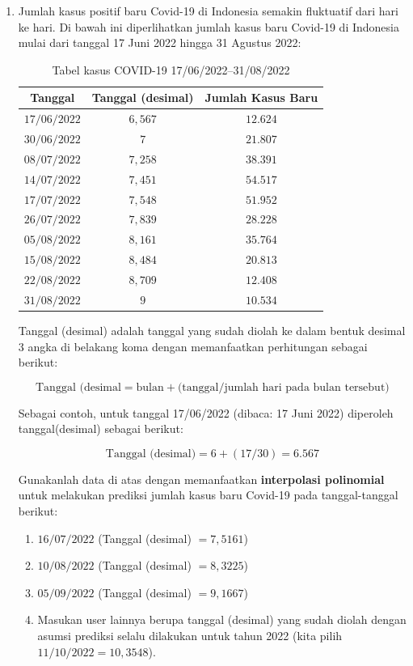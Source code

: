 \begin{enumerate}[label=(\alph*)]
\pagebreak
    \item Jumlah kasus positif baru Covid-19 di Indonesia semakin fluktuatif dari hari ke hari. Di bawah ini diperlihatkan jumlah kasus baru Covid-19 di Indonesia mulai dari tanggal 17 Juni 2022 hingga 31 Agustus 2022:

    
    \begin{table}[H]
        \centering
        \caption{Tabel kasus COVID-19 17/06/2022--31/08/2022}
        \begin{tabular}{c|c|c}
             Tanggal	&	Tanggal (desimal)	&	Jumlah Kasus Baru	\\
             \hline
             \hline
$17/06/2022$	&	$6,567$	&	$12.624$	\\
$30/06/2022$	&	$7$	    &	$21.807$	\\
$08/07/2022$	&	$7,258$	&	$38.391$	\\
$14/07/2022$	&	$7,451$	&	$54.517$	\\
$17/07/2022$	&	$7,548$	&	$51.952$	\\
$26/07/2022$	&	$7,839$	&	$28.228$	\\
$05/08/2022$	&	$8,161$	&	$35.764$	\\
$15/08/2022$	&	$8,484$	&	$20.813$	\\
$22/08/2022$	&	$8,709$	&	$12.408$	\\
$31/08/2022$	&	$9$	    &	$10.534$	
        \end{tabular}
    \end{table}

    Tanggal (desimal) adalah tanggal yang sudah diolah ke dalam bentuk desimal 3 angka di belakang koma dengan memanfaatkan perhitungan sebagai berikut:

    \[ \text{Tanggal (desimal} = \text{bulan} + \text{(tanggal/jumlah hari pada bulan tersebut)} \]

    Sebagai contoh, untuk tanggal 17/06/2022 (dibaca: 17 Juni 2022) diperoleh tanggal(desimal) sebagai berikut:

    \[\text{Tanggal (desimal)} = 6 + (17/30) = 6.567 \]

    Gunakanlah data di atas dengan memanfaatkan \textbf{interpolasi polinomial} untuk melakukan prediksi jumlah kasus baru Covid-19 pada tanggal-tanggal berikut:

    \begin{enumerate}[label=(\roman*)]
        \item $16/07/2022$ (Tanggal (desimal) $= 7,5161$)
        \item $10/08/2022$ (Tanggal (desimal) $= 8,3225$)
        \item $05/09/2022$ (Tanggal (desimal) $= 9,1667$)
        \item Masukan user lainnya berupa tanggal (desimal) yang sudah diolah dengan asumsi prediksi selalu dilakukan untuk tahun 2022 (kita pilih $11/10/2022 = 10,3548$).
    \end{enumerate}


\end{enumerate}
